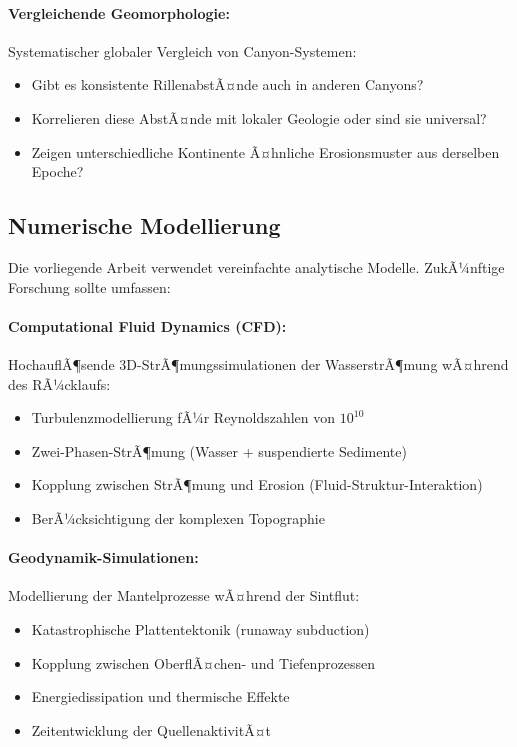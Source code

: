 ﻿\documentclass[12pt,a4paper]{report}
\begin{document}
\paragraph{Vergleichende Geomorphologie:}
Systematischer globaler Vergleich von Canyon-Sys\-temen:
\begin{itemize}
	\item Gibt es konsistente RillenabstÃ¤nde auch in anderen Canyons?
	\item Korrelieren diese AbstÃ¤nde mit lokaler Geologie oder sind sie universal?
	\item Zeigen unterschiedliche Kontinente Ã¤hnliche Erosionsmuster aus derselben Epoche?
\end{itemize}

\subsection{Numerische Modellierung}

Die vorliegende Arbeit verwendet vereinfachte analytische Modelle. ZukÃ¼nftige Forschung sollte umfassen:

\paragraph{Computational Fluid Dynamics (CFD):}
HochauflÃ¶sende 3D-StrÃ¶mungssimulationen der WasserstrÃ¶mung wÃ¤hrend des RÃ¼cklaufs:
\begin{itemize}
	\item Turbulenzmodellierung fÃ¼r Reynoldszahlen von $10^{10}$
	\item Zwei-Phasen-StrÃ¶mung (Wasser + suspendierte Sedimente)
	\item Kopplung zwischen StrÃ¶mung und Erosion (Fluid-Struktur-Interaktion)
	\item BerÃ¼cksichtigung der komplexen Topographie
\end{itemize}

\paragraph{Geodynamik-Simulationen:}
Modellierung der Mantelprozesse wÃ¤hrend der Sintflut:
\begin{itemize}
	\item Katastrophische Plattentektonik (\glqq runaway subduction\grqq)
	\item Kopplung zwischen OberflÃ¤chen- und Tiefenprozessen
	\item Energiedissipation und thermische Effekte
	\item Zeitentwicklung der QuellenaktivitÃ¤t
\end{itemize}
\end{document}
